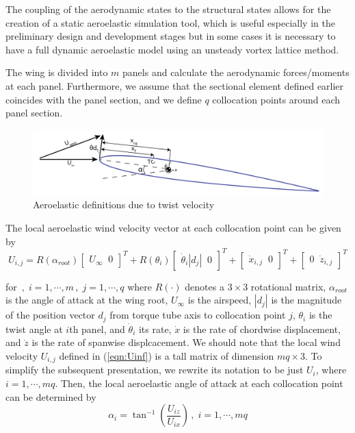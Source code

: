 \documentclass[11pt]{ucthesis}
\begin{document}
The coupling of the aerodynamic states to the structural states allows for the creation of a static aeroelastic simulation tool, which is useful especially in the preliminary design and development stages but in some cases it is necessary to have a full dynamic aeroelastic model using an unsteady vortex lattice method. 

The wing is divided into $m$ panels and calculate the aerodynamic forces/moments at each panel. Furthermore, we assume that the sectional element defined earlier coincides with the panel section, and we define $q$ collocation points around each panel section. 

\begin{figure}[h]
\centering
\includegraphics[width=1\linewidth]{Figures/AeroelasticDefinitions-01.png}
\caption{Aeroelastic definitions due to twist velocity}
\label{fig:def}
\end{figure}

The local aeroelastic wind velocity vector at each collocation point can be given by
\begin{equation}
U_{i,j} = R(\alpha_{root})\begin{bmatrix}U_{\infty} \;\; 0\end{bmatrix}^T +  R(\theta_{i})\begin{bmatrix}\dot{\theta}_{i} |d_{j}| \;\; 0\end{bmatrix}^T + \begin{bmatrix}\dot{x}_{i,j}\;\; 0\end{bmatrix}^T + \begin{bmatrix}0\;\; \dot{z}_{i,j}\end{bmatrix}^T
\label{eqn:Uinf}
\end{equation}

for $ \,,\;i=1,\cdots, m\,,\;j=1,\cdots, q$ where $R(\cdot)$ denotes a $3\times 3$ rotational matrix, $\alpha_{root}$ is the angle of attack at the wing root, $U_{\infty}$ is the airspeed, $|d_{j}|$ is the magnitude of the position vector $d_{j}$ from torque tube axis to collocation point $j$, $\theta_i$ is the twist angle at $i$th panel, and $\dot{\theta}_i$ its rate, $\dot{x}$ is the rate of chordwise displacement, and $\dot{z}$ is the rate of spanwise displcacement. We should note that the local wind velocity $U_{i,j}$ defined in (\ref{eqn:Uinf}) is a tall matrix of dimension $mq \times 3$. To simplify the subsequent presentation, we rewrite its notation to be just $U_i$, where $i=1,\cdots,mq$. Then, the local aeroelastic angle of attack at each collocation point can be determined by
\begin{equation}
\alpha_{i} = \tan^{-1} \left (\frac{U_{iz}}{U_{ix}} \right) \,,\;i=1,\cdots, mq
\label{eqn:alpha_aero}
\end{equation}
\end{document}
